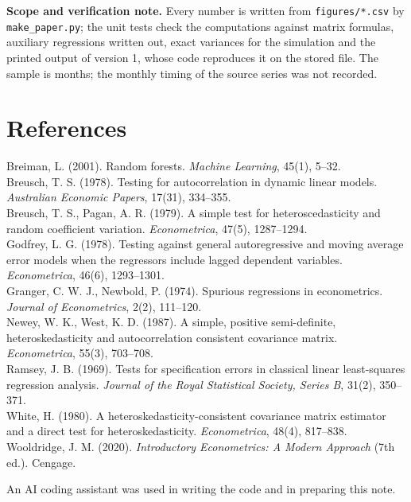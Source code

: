 \documentclass[11pt,a4paper]{article}
\begin{document}
\textbf{Scope and verification note.} Every number is written from \texttt{figures/*.csv} by \texttt{make\_paper.py};
the unit tests check the computations against matrix formulas, auxiliary regressions written out, exact variances
for the simulation and the printed output of version 1, whose code reproduces it on the stored file. The sample is
\Nobs{} months; the monthly timing of the source series was not recorded.

\section*{References}
{\small
Breiman, L. (2001). Random forests. \textit{Machine Learning}, 45(1), 5--32.\\
Breusch, T. S. (1978). Testing for autocorrelation in dynamic linear models. \textit{Australian Economic Papers},
17(31), 334--355.\\
Breusch, T. S., Pagan, A. R. (1979). A simple test for heteroscedasticity and random coefficient variation.
\textit{Econometrica}, 47(5), 1287--1294.\\
Godfrey, L. G. (1978). Testing against general autoregressive and moving average error models when the regressors
include lagged dependent variables. \textit{Econometrica}, 46(6), 1293--1301.\\
Granger, C. W. J., Newbold, P. (1974). Spurious regressions in econometrics. \textit{Journal of Econometrics}, 2(2),
111--120.\\
Newey, W. K., West, K. D. (1987). A simple, positive semi-definite, heteroskedasticity and autocorrelation consistent
covariance matrix. \textit{Econometrica}, 55(3), 703--708.\\
Ramsey, J. B. (1969). Tests for specification errors in classical linear least-squares regression analysis.
\textit{Journal of the Royal Statistical Society, Series B}, 31(2), 350--371.\\
White, H. (1980). A heteroskedasticity-consistent covariance matrix estimator and a direct test for
heteroskedasticity. \textit{Econometrica}, 48(4), 817--838.\\
Wooldridge, J. M. (2020). \textit{Introductory Econometrics: A Modern Approach} (7th ed.). Cengage.

\smallskip
An AI coding assistant was used in writing the code and in preparing this note.
}
\end{document}
